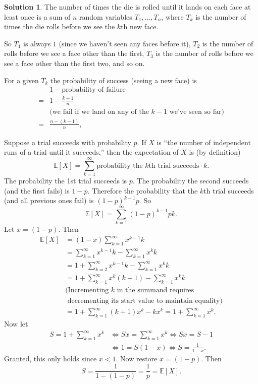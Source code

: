 \documentclass{article}
\theoremstyle{definition}
\newtheorem{sol}{Solution}
\theoremstyle{plain}
\newcommand{\Exp}[1]{\mathbb{E}\left[#1\right]}
\begin{document}
\begin{sol}
The number of times the die is rolled until it lands on each face at least once is a sum of $n$ random variables $T_1,\dots,T_n$, where $T_k$ is the number of times the die rolls before we see the $k$th new face.

So $T_1$ is always $1$ (since we haven't seen any faces before it), $T_2$ is the number of rolls before we see a face other than the first, $T_3$ is the number of rolls before we see a face other than the first two, and so on.

For a given $T_k$ the probability of success (seeing a new face) is
\begin{align}
&1 - \text{probability of failure} \nonumber \\
={}& 1 - \frac{k-1}{n} \nonumber \\
& \text{(we fail if we land on any of the $k-1$ we've seen so far)} \nonumber \\ 
={}& \frac{n-(k-1)}{n}, \label{prob:success}
\end{align}

Suppose a trial succeeds with probability $p$. If $X$ is ``the number of independent runs of a trial until it succeeds,''
then the expectation of $X$ is (by definition)
\[
\Exp{X} = \sum_{k=1}^{\infty} \text{probability the $k$th trial succeeds} \cdot k.
\]
The probability the 1st trial succeeds is $p$. The probability the second succeeds (and the first fails) is $1-p$.
Therefore the probability that the $k$th trial succeeds (and all previous ones fail) is $(1-p)^{k-1}p$. So
\[
\Exp{X} = \sum_{k=1}^{\infty}(1-p)^{k-1}pk.
\]
Let $x = (1-p)$. Then
\begin{align*}
\Exp{X} &= (1-x)\sum_{k=1}^{\infty}x^{k-1}k \\
&= \sum_{k=1}^{\infty}x^{k-1}k - \sum_{k=1}^{\infty}x^kk\\
&= 1 + \sum_{k=2}^{\infty}x^{k-1}k - \sum_{k=1}^{\infty}x^kk\\
&= 1 + \sum_{k=1}^{\infty}x^k(k+1) - \sum_{k=1}^{\infty}x^kk \\
&{} \text{(Incrementing $k$ in the summand requires }\\
&{} \text{ decrementing its start value to maintain equality)}\\
&= 1 + \sum_{k=1}^{\infty}(k+1)x^k - kx^k = 1 + \sum_{k=1}^{\infty} x^k.
\end{align*}
Now let
\begin{align*}
S = 1 + \sum_{k=1}^{\infty}x^k &\iff  Sx = \sum_{k=1}^{\infty}x^k \iff Sx = S - 1\\
&\iff 1 = S(1 - x) \iff S = \frac{1}{1-x}.
\end{align*}
Granted, this only holds since $x < 1$. Now restore $x = (1-p)$. Then
\[
S = \frac{1}{1-(1-p)} = \frac{1}{p} = \Exp{X}.
\]


\end{sol}
\end{document}
